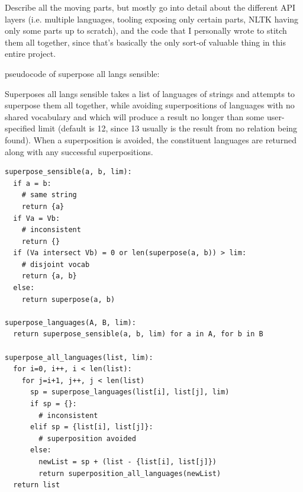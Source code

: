 \documentclass[a4paper,12pt,leqno]{article}
\begin{document}
Describe all the moving parts, but mostly go into detail about the different API layers (i.e. multiple languages, tooling exposing only certain parts, NLTK having only some parts up to scratch), and the code that I personally wrote to stitch them all together, since that's basically the only sort-of valuable thing in this entire project.

pseudocode of superpose all langs sensible:

Superposes all langs sensible takes a list of languages of strings and attempts to superpose them all together, while avoiding superpositions of languages with no shared vocabulary and which will produce a result no longer than some user-specified limit (default is 12, since 13 usually is the result from no relation being found). When a superposition is avoided, the constituent languages are returned along with any successful superpositions.

\begin{verbatim}
superpose_sensible(a, b, lim):
  if a = b:
    # same string
    return {a}
  if Va = Vb:
    # inconsistent
    return {}
  if (Va intersect Vb) = 0 or len(superpose(a, b)) > lim:
    # disjoint vocab
    return {a, b}
  else:
    return superpose(a, b)

superpose_languages(A, B, lim):
  return superpose_sensible(a, b, lim) for a in A, for b in B

superpose_all_languages(list, lim):
  for i=0, i++, i < len(list):
    for j=i+1, j++, j < len(list)
      sp = superpose_languages(list[i], list[j], lim)
      if sp = {}:
        # inconsistent
      elif sp = {list[i], list[j]}:
        # superposition avoided
      else:
        newList = sp + (list - {list[i], list[j]})
        return superposition_all_languages(newList)
  return list
\end{verbatim}
\end{document}
